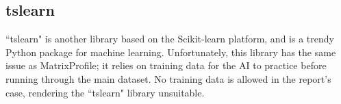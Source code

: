 \subsection{tslearn}
``tslearn" is another library based on the Scikit-learn platform, and is a trendy Python package for machine learning. Unfortunately, this library has the same issue as MatrixProfile; it relies on training data for the AI to practice before running through the main dataset. No training data is allowed in the report's case, rendering the ``tslearn" library unsuitable.
